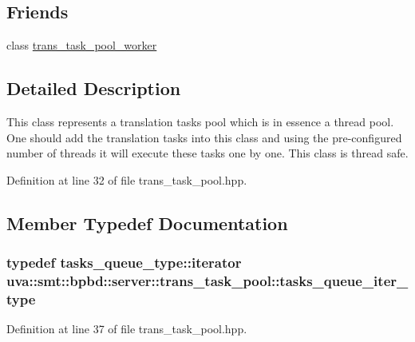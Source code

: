 \subsection*{Friends}
\begin{DoxyCompactItemize}
\item 
class \hyperlink{classuva_1_1smt_1_1bpbd_1_1server_1_1trans__task__pool_a7736eb5d0c376b16fcd53d37de985e1c}{trans\+\_\+task\+\_\+pool\+\_\+worker}
\end{DoxyCompactItemize}


\subsection{Detailed Description}
This class represents a translation tasks pool which is in essence a thread pool. One should add the translation tasks into this class and using the pre-\/configured number of threads it will execute these tasks one by one. This class is thread safe. 

Definition at line 32 of file trans\+\_\+task\+\_\+pool.\+hpp.



\subsection{Member Typedef Documentation}
\hypertarget{classuva_1_1smt_1_1bpbd_1_1server_1_1trans__task__pool_a9188b77cca863f71b4a8eb42ee7ffd20}{}
\subsubsection[{tasks\+\_\+queue\+\_\+iter\+\_\+type}]{\setlength{\rightskip}{0pt plus 5cm}typedef tasks\+\_\+queue\+\_\+type\+::iterator {\bf uva\+::smt\+::bpbd\+::server\+::trans\+\_\+task\+\_\+pool\+::tasks\+\_\+queue\+\_\+iter\+\_\+type}}\label{classuva_1_1smt_1_1bpbd_1_1server_1_1trans__task__pool_a9188b77cca863f71b4a8eb42ee7ffd20}


Definition at line 37 of file trans\+\_\+task\+\_\+pool.\+hpp.

\hypertarget{classuva_1_1smt_1_1bpbd_1_1server_1_1trans__task__pool_a854d6c3235224e2b976ab92b450461eb}{}
